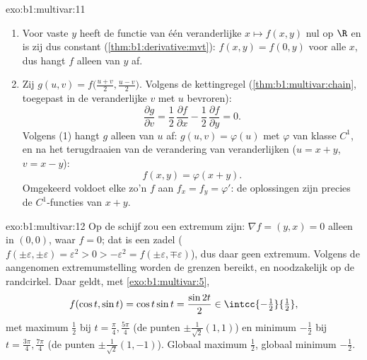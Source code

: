 \begin{solution}{exo:b1:multivar:11}
\begin{enumerate}
  \item Voor vaste $y$ heeft de functie van één veranderlijke $x
        \mapsto f(x,y)$  nul op $\R$ en is zij dus
        constant (\cref{thm:b1:derivative:mvt}): $f(x, y) = f(0,
        y)$ voor alle $x$, dus hangt $f$ alleen van $y$ af.
  \item Zij $g(u, v) = f\bigl(\frac{u+v}2, \frac{u-v}2\bigr)$.
        Volgens de kettingregel (\cref{thm:b1:multivar:chain},
        toegepast in de veranderlijke $v$ met $u$ bevroren):
        \[
        \frac{\partial g}{\partial v}
        = \frac12\,\frac{\partial f}{\partial x}
        - \frac12\,\frac{\partial f}{\partial y} = 0 .
        \]
        Volgens (1) hangt $g$ alleen van $u$ af: $g(u, v) =
        \varphi(u)$ met $\varphi$ van klasse $C^1$, en na het
        terugdraaien van de verandering van veranderlijken ($u = x
        + y$, $v = x - y$):
        \[
        f(x, y) = \varphi(x + y).
        \]
        Omgekeerd voldoet elke zo'n $f$ aan $f_x = f_y = \varphi'$:
        de oplossingen zijn precies de $C^1$-functies van $x + y$.
\end{enumerate}
\end{solution}

\begin{solution}{exo:b1:multivar:12}
Op de  schijf zou een extremum  zijn: $\nabla f = (y,
x) = 0$ alleen in $(0,0)$, waar $f = 0$; dat is een zadel
($f(\pm\varepsilon, \pm\varepsilon) = \varepsilon^2 > 0 >
-\varepsilon^2 = f(\pm\varepsilon, \mp\varepsilon)$), dus daar geen
extremum. Volgens de aangenomen extremumstelling worden de grenzen
bereikt, en noodzakelijk op de randcirkel. Daar geldt, met
\cref{exo:b1:multivar:5},
\[
f(\cos t, \sin t) = \cos t\sin t = \frac{\sin 2t}{2}
\in \intcc{-\tfrac12}{\tfrac12},
\]
met maximum $\frac12$ bij $t = \frac\pi4, \frac{5\pi}4$ (de punten
$\pm\frac{1}{\sqrt2}(1,1)$) en minimum $-\frac12$ bij $t =
\frac{3\pi}4, \frac{7\pi}4$ (de punten
$\pm\frac{1}{\sqrt2}(1,-1)$). Globaal maximum $\frac12$, globaal
minimum $-\frac12$.
\end{solution}

